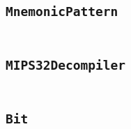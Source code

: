 \documentclass[a4paper]{article}
\begin{document}
\begin{appendix}
    \begin{landscape}
    \section{\texttt{MnemonicPattern}}\label{code:MnemonicPattern}
    \begin{multicols}{2} %
    \inputminted[mathescape,
        linenos,
        numbersep=5pt,
        frame=none,
        framesep=2mm,
        fontsize=\footnotesize]{java}{../src/main/java/se/filipallberg/dark/mips32decompiler/instruction/mnemonic/MnemonicPattern.java}
    \end{multicols}
    \end{landscape}
    


    \begin{landscape}
    \section{\texttt{MIPS32Decompiler}}\label{code:MIPS32Decompiler}
    \begin{multicols}{2} %
    \inputminted[mathescape,
        linenos,
        numbersep=5pt,
        frame=none,
        framesep=2mm,
        fontsize=\footnotesize]{java}{../src/main/java/se/filipallberg/dark/mips32decompiler/MIPS32Decompiler.java}
    \end{multicols}
    \end{landscape}
    


    \begin{landscape}
    \section{\texttt{Bit}}\label{code:Bit}
    \begin{multicols}{2} %
    \inputminted[mathescape,
        linenos,
        numbersep=5pt,
        frame=none,
        framesep=2mm,
        fontsize=\footnotesize]{java}{../src/main/java/se/filipallberg/util/Bit.java}
    \end{multicols}
    \end{landscape}
    



\end{appendix}
\end{document}
